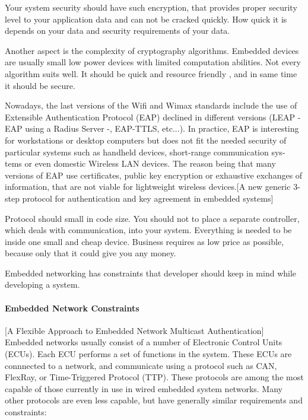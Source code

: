 Your system security should have such encryption, that provides proper security
level to your application data and can not be cracked quickly.
How quick it is depends on your data and security requirements of your data.

Another aspect is the complexity of cryptography algorithms. Embedded devices
are usually small low power devices with limited computation abilities. Not
every algorithm suits well. It should be quick and resource friendly , and in
same time it should be secure.

Nowadays, the last versions of the Wifi and Wimax standards include the use of
Extensible Authentication Protocol (EAP) declined in different versions
(LEAP - EAP using a Radius Server -, EAP-TTLS, etc...). In practice, EAP is interesting for workstations or desktop computers but does not fit the needed security of particular systems such as handheld devices, short-range communication sys- tems or even domestic Wireless LAN devices. The reason being that many versions of EAP use certificates,
public key encryption or exhaustive exchanges of information, that are not viable for lightweight wireless
devices.[A new generic 3-step protocol for authentication and key
agreement in embedded systems]

Protocol should small in code size. You should not to place a
separate controller, which deals with communication,  into your system.
Everything is needed to be inside one small and cheap device. Business requires
as low price as possible, because only that it could give you any money.


Embedded networking has constraints that developer should keep in mind
while developing a system.

% 

\paragraph{Embedded Network Constraints} [A Flexible Approach to Embedded Network
Multicast Authentication]
Embedded networks usually consist of a number of Electronic Control
Units (ECUs). Each ECU performs a set of functions in the system. These ECUs are
connnected to a network, and communicate using a protocol such as CAN,
FlexRay, or Time-Triggered Protocol (TTP). These protocols are among the most
capable of those currently in use in wired embedded system networks. Many other protocols are even
less capable, but have generally similar requirements and constraints:

